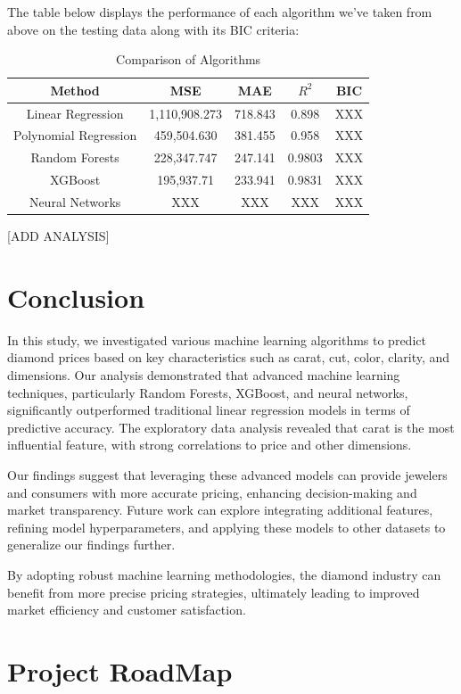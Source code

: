 \documentclass[conference]{IEEEtran}
\begin{document}
The table below displays the performance of each algorithm we've taken from above on the testing data along with its BIC criteria:

\begin{table}[H]
\centering
\caption{Comparison of Algorithms}
\begin{tabular}{|c|c|c|c|c|}
\hline
Method & MSE & MAE & $R^2$ & BIC \\
\hline
Linear Regression & 1,110,908.273 & 718.843 & 0.898 & XXX \\
\hline
Polynomial Regression & 459,504.630 & 381.455 &  0.958 & XXX \\
\hline
Random Forests & 228,347.747 & 247.141 & 0.9803 & XXX \\
\hline
XGBoost & 195,937.71 & 233.941 & 0.9831 & XXX \\
\hline
Neural Networks & XXX & XXX & XXX & XXX \\
\hline
\end{tabular}
\label{tab:mytable}
\end{table}

[ADD ANALYSIS]

\section{Conclusion}

In this study, we investigated various machine learning algorithms to predict diamond prices based on key characteristics such as carat, cut, color, clarity, and dimensions. Our analysis demonstrated that advanced machine learning techniques, particularly Random Forests, XGBoost, and neural networks, significantly outperformed traditional linear regression models in terms of predictive accuracy. The exploratory data analysis revealed that carat is the most influential feature, with strong correlations to price and other dimensions. 

Our findings suggest that leveraging these advanced models can provide jewelers and consumers with more accurate pricing, enhancing decision-making and market transparency. Future work can explore integrating additional features, refining model hyperparameters, and applying these models to other datasets to generalize our findings further.

By adopting robust machine learning methodologies, the diamond industry can benefit from more precise pricing strategies, ultimately leading to improved market efficiency and customer satisfaction.

\section{Project RoadMap}
\end{document}
